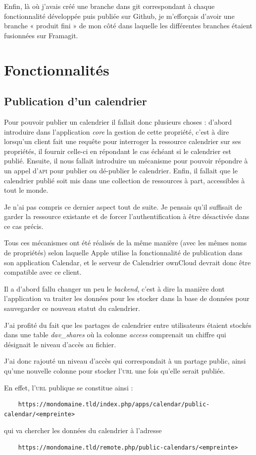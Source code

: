 \documentclass[10pt,a4paper, twoside]{report}
\begin{document}
	Enfin, là où j'avais créé une branche dans git correspondant à chaque fonctionnalité développée puis publiée sur Github, je m'efforçais d'avoir une branche « produit fini » de mon côté dans laquelle les différentes branches étaient fusionnées sur Framagit.
	
	\section{Fonctionnalités}
	\subsection{Publication d'un calendrier}
	Pour pouvoir publier un calendrier il fallait donc plusieurs choses : d'abord introduire dans l'application \textit{core} la gestion de cette propriété, c'est à dire lorsqu'un client fait une requête pour interroger la ressource calendrier sur ses propriétés, il fournir celle-ci en répondant le cas échéant si le calendrier est publié.
	Ensuite, il nous fallait introduire un mécanisme pour pouvoir répondre à un appel d'\textsc{api} pour publier ou dé-publier le calendrier. Enfin, il fallait que le calendrier publié soit mis dans une collection de ressources à part, accessibles à tout le monde.
	
	Je n'ai pas compris ce dernier aspect tout de suite. Je pensais qu'il suffisait de garder la ressource existante et de forcer l'authentification à être désactivée dans ce cas précis.
	
	Tous ces mécanismes ont été réalisés de la même manière (avec les mêmes noms de propriétés) selon laquelle Apple utilise la fonctionnalité de publication dans son application Calendar, et le serveur de Calendrier ownCloud devrait donc être compatible avec ce client.
	
	Il a d'abord fallu changer un peu le \textit{backend}, c'est à dire la manière dont l'application va traiter les données pour les stocker dans la base de données pour sauvegarder ce nouveau statut du calendrier.
	
	J'ai profité du fait que les partages de calendrier entre utilisateurs étaient stockés dans une table \textit{dav\_shares} où la colonne \textit{access} comprenait un chiffre qui désignait le niveau d'accès au fichier.
	
	J'ai donc rajouté un niveau d'accès qui correspondait à un partage public, ainsi qu'une nouvelle colonne pour stocker l'\textsc{url} une fois qu'elle serait publiée. 
	
	En effet, l'\textsc{url} publique se constitue ainsi : 
	\begin{verbatim}
	https://mondomaine.tld/index.php/apps/calendar/public-calendar/<empreinte>
	\end{verbatim}
	qui va chercher les données du calendrier à l'adresse
	\begin{verbatim}
	https://mondomaine.tld/remote.php/public-calendars/<empreinte>
	\end{verbatim}
	
\end{document}

